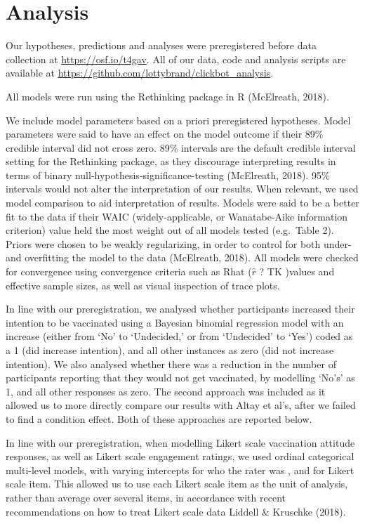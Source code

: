 \documentclass[
  english,
  ,jou,floatsintext]{apa6}
\begin{document}
\hypertarget{analysis}{%
\section{Analysis}\label{analysis}}

Our hypotheses, predictions and analyses were preregistered before data collection at \url{https://osf.io/t4gav}. All of our data, code and analysis scripts are available at \url{https://github.com/lottybrand/clickbot_analysis}.

All models were run using the Rethinking package in R (McElreath, 2018).

We include model parameters based on a priori preregistered hypotheses. Model parameters were said to have an effect on the model outcome if their 89\% credible interval did not cross zero. 89\% intervals are the default credible interval setting for the Rethinking package, as they discourage interpreting results in terms of binary null-hypothesis-significance-testing (McElreath, 2018). 95\% intervals would not alter the interpretation of our results. When relevant, we used model comparison to aid interpretation of results. Models were said to be a better fit to the data if their WAIC (widely-applicable, or Wanatabe-Aike information criterion) value held the most weight out of all models tested (e.g.~Table 2).
Priors were chosen to be weakly regularizing, in order to control for both under- and overfitting the model to the data (McElreath, 2018). All models were checked for convergence using convergence criteria such as Rhat (\(\hat{r}\) ? TK )values and effective sample sizes, as well as visual inspection of trace plots.

In line with our preregistration, we analysed whether participants increased their intention to be vaccinated using a Bayesian binomial regression model with an increase (either from `No' to `Undecided,' or from `Undecided' to `Yes') coded as a 1 (did increase intention), and all other instances as zero (did not increase intention). We also analysed whether there was a reduction in the number of participants reporting that they would not get vaccinated, by modelling `No's' as 1, and all other responses as zero. The second approach was included as it allowed us to more directly compare our results with Altay et al's, after we failed to find a condition effect. Both of these approaches are reported below.

In line with our preregistration, when modelling Likert scale vaccination attitude responses, as well as Likert scale engagement ratings, we used ordinal categorical multi-level models, with varying intercepts for who the rater was , and for Likert scale item. This allowed us to use each Likert scale item as the unit of analysis, rather than average over several items, in accordance with recent recommendations on how to treat Likert scale data Liddell \& Kruschke (2018).
\end{document}
